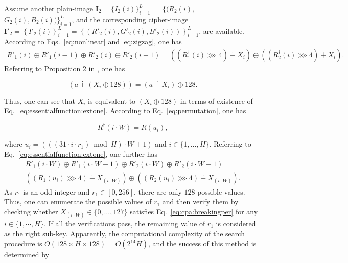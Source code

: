 \documentclass{ws-ijbc}
\begin{document}
Assume another plain-image $\mathbf{I}_2 =  \{I_2(i)\}_{i=1}^{L}$ $=\{(R_2(i)$, $G_2(i), B_2(i))\}_{i=1}^{L}$,
and the corresponding cipher-image
$\mathbf{I}'_2=\left\{I'_2(i)\right\}_{i=1}^{L}=\left\{\left(R'_2(i), G'_2(i), B'_2(i)\right)\right\}_{i=1}^{L}$,
are available.
According to Eqs.~\eqref{eq:nonlinear} and \eqref{eq:zigzag},
one has
\begin{multline}
\label{eq:essentialfunction:extone}
R'_1(i) \oplus R'_1(i-1) \oplus R'_2(i) \oplus R'_2(i-1) =
 \left(\left(R^{\dagger}_1(i)\ggg 4\right) \dotplus X_{i}\right)
 \oplus \left(\left(R^{\dagger}_2(i)\ggg 4\right) \dotplus X_{i}\right).
\end{multline}
Referring to Proposition 2 in \cite{Li:hyperchaotic:ND2013}, one has
\begin{linenomath}
\begin{equation}
\label{eq:cpa:equi}
(a \dotplus (X_{i} \oplus 128)) = (a \dotplus X_{i}) \oplus 128.
\end{equation}
\end{linenomath}
Thus, one can see that $X_{i}$ is equivalent to $(X_{i}\oplus 128)$
in terms of existence of Eq.~\eqref{eq:essentialfunction:extone}.
According to Eq.~\eqref{eq:permutation}, one has
\begin{linenomath}
\begin{equation}
\nonumber
R^{\dagger}(i\cdot W) = R(u_i),
\end{equation}
\end{linenomath}
where $u_i = (((31 \cdot i\cdot r_1)\bmod{H})\cdot W+1)$ and $i \in \{1,\ldots, H\}$.
Referring to Eq.~\eqref{eq:essentialfunction:extone}, one further has
\begin{multline}
\label{eq:cpa:breakingper}
R'_1(i\cdot W) \oplus R'_1(i\cdot W-1) \oplus R'_2(i\cdot W) \oplus R'_2(i\cdot W-1)= \\
\left(\left(R_1(u_i)\ggg 4\right) \dotplus X_{(i\cdot W)}\right)\oplus \left(\left(R_2(u_i)\ggg 4\right) \dotplus X_{(i\cdot W)}\right).
\end{multline}
As $r_1$ is an odd integer and $r_1\in [0, 256]$,
there are only $128$ possible values. Thus,
one can enumerate the possible values of $r_1$ and then verify them by checking whether $X_{(i\cdot W)} \in \{0,\ldots, 127\}$
satisfies Eq.~\eqref{eq:cpa:breakingper} for any $i \in\{1, \cdots, H\}$.
If all the verifications pass, the remaining value of $r_1$ is considered as the right sub-key.
Apparently, the computational complexity of the search procedure is
$O(128\times H\times 128) = O(2^{14}H)$,
and the success of this method is determined by
\end{document}
